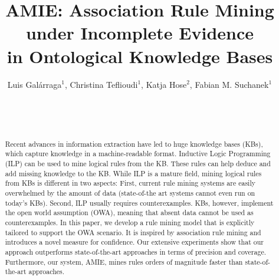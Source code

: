 \documentclass{www2013-accepted}
\begin{document}

\title{AMIE: Association Rule Mining under Incomplete Evidence\\in Ontological Knowledge Bases\vspace{-0.5cm}}


\author{
\alignauthor
Luis Gal\'arraga$^1$, Christina Teflioudi$^1$, Katja Hose$^2$, Fabian M. Suchanek$^1$ \\
       \\
       \\
       \\
       \email{}
}



\maketitle
\begin{abstract}
Recent advances in information extraction have led to huge knowledge bases (KBs), which capture knowledge in a ma\-chine-readable format. 
Inductive Logic Programming (ILP) can be used to mine logical rules from the KB.
These rules can help deduce and add missing knowledge to the KB.
While ILP is a mature field, mining logical rules from KBs is different in two aspects: First, current rule mining systems are easily overwhelmed by the amount of data (state-of-the art systems cannot even run on today's KBs). Second, ILP usually requires counterexamples. KBs, however, implement the open world assumption (OWA), meaning that absent data cannot be used as counterexamples. 
In this paper, we develop a rule mining model that is explicitly tailored to support the OWA scenario. It is inspired by association rule mining and introduces a novel measure for confidence.
Our extensive experiments show that our approach outperforms state-of-the-art approaches in terms of precision and coverage.
Furthermore, our system, AMIE, mines rules orders of magnitude faster than state-of-the-art approaches. 
\end{abstract}
\end{document}
